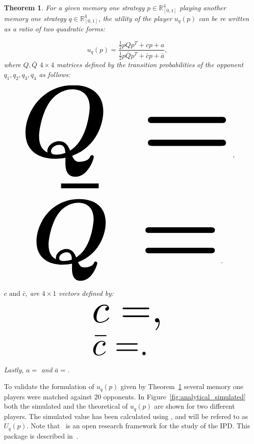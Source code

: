 \documentclass[10pt]{article}
\newtheorem{theorem}{Theorem}
\begin{document}
\begin{theorem}\label{theorem:quadratic_form_u}
    For a given memory one strategy \(p\in\mathbb{R}_{[0,1]}^4\) playing another 
    memory one strategy \(q\in\mathbb{R}_{[0,1]}^4\), the 
    utility of the player \(u_q(p)\) can be re written as a ratio of two quadratic
    forms:
    
    \begin{equation}\label{eq:optimisation_quadratic}
    u_q(p) = \frac{\frac{1}{2}pQp^T + cp + a}
                {\frac{1}{2}p\bar{Q}p^T + \bar{c}p + \bar{a}}, 
    \end{equation}
    where \(Q, \bar{Q}\) \(4 \times 4\) matrices defined by the transition
    probabilities of the opponent \(q_1, q_2, q_3, q_4\) as follows:
    
    \begin{center}
    \begin{equation}
    \resizebox{0.9\linewidth}{!}{\arraycolsep=2.5pt%
    \boldmath\(
    Q = \)},
    \end{equation}
    \begin{equation}\label{eq:q_bar_matrix}
    \resizebox{0.8\linewidth}{!}{\arraycolsep=2.5pt%
    \boldmath\(
    \bar{Q} =  \)}.
    \end{equation}
    \end{center}
    
    \(c \text{ and } \bar{c}\), are \(4 \times 1\) vectors defined by:
    
    \begin{equation}\label{eq:q_matrix_numerator}
    \resizebox{0.3\linewidth}{!}{\arraycolsep=2.5pt%
    \(c = \),}
    \end{equation}
    \begin{equation}\label{eq:q_matrix_denominator}
    \resizebox{0.3\linewidth}{!}{\arraycolsep=2.5pt%
    \(\bar{c} = \).
    }
    \end{equation}
    
    Lastly, \(a = \) and 
    \(\bar{a} = \).
    \end{theorem}

To validate the formulation of \(u_q(p)\) given by Theorem~\ref{theorem:quadratic_form_u}
several memory one players were matched against 20 opponents. In Figure~\ref{fig:analytical_simulated}
both the simulated and the theoretical of \(u_q(p)\) are shown for two different
players. The simulated value has been calculated using \cite{axelrodproject}, and
will be refered to as \(U_q(p)\). Note that~\cite{axelrodproject} is an open research
framework for the study of the IPD. This package is described in~\cite{Knight2016}.
\end{document}
